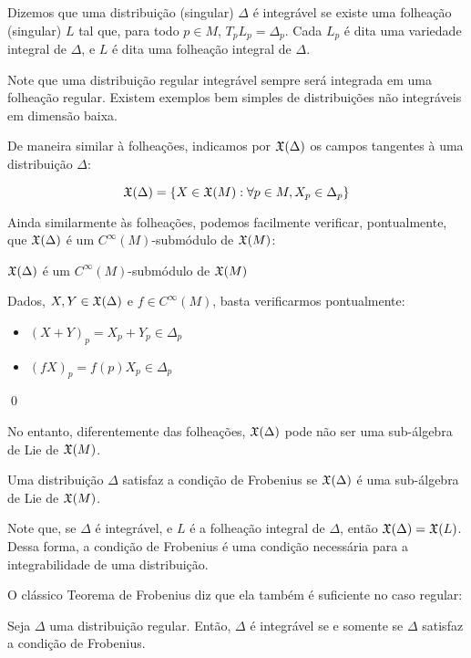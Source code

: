 Dizemos que uma distribuição (singular) $\Delta$ é integrável
se existe uma folheação (singular) $L$ tal que, para todo
$p \in M$, $T_p L_p = \Delta_p$. Cada $L_p$ é dita uma variedade integral
de $\Delta$, e $L$ é dita uma folheação integral de $\Delta$.

Note que uma distribuição regular integrável sempre será integrada em uma
folheação regular. Existem exemplos bem simples de distribuições não integráveis
em dimensão baixa.

De maneira similar à folheações, indicamos por $\mathfrak{X}(\Delta)$ os campos tangentes à
uma distribuição $\Delta$:

$$\mathfrak{X}(\Delta) = \{X \in \mathfrak{X}(M) : \forall p \in M, X_p \in \Delta_p\}$$

Ainda similarmente às folheações,
podemos facilmente verificar, pontualmente, que $\mathfrak{X}(\Delta)$
é um $C^\infty(M)$-submódulo
de $\mathfrak{X}(M)$:

\begin{proposition}
    $\mathfrak{X}(\Delta)$ é um $C^\infty(M)$-submódulo
    de $\mathfrak{X}(M)$
\end{proposition}

\dem Dados, $X,Y \in \mathfrak{X}(\Delta)$ e $f \in C^\infty(M)$, basta verificarmos pontualmente:

\begin{itemize}
    \item $(X+Y)_p = X_p + Y_p \in \Delta_p$
    \item $(fX)_p = f(p) X_p \in \Delta_p$
\end{itemize} \qed

No entanto, diferentemente das folheações, $\mathfrak{X}(\Delta)$ pode não ser
uma sub-álgebra de Lie de $\mathfrak{X}(M)$.

\begin{definition}
    Uma distribuição $\Delta$ satisfaz a condição de Frobenius
    se $\mathfrak{X}(\Delta)$ é uma sub-álgebra de Lie de $\mathfrak{X}(M)$.
\end{definition}

Note que, se $\Delta$ é integrável, e $L$ é a folheação integral de $\Delta$,
então $\mathfrak{X}(\Delta) = \mathfrak{X}(L)$. Dessa forma, a condição de Frobenius é uma condição
necessária para a integrabilidade de uma distribuição.

O clássico Teorema de Frobenius diz que ela também é suficiente no caso regular:

\begin{theorem}
    Seja $\Delta$ uma distribuição regular. Então, $\Delta$ é integrável
    se e somente se $\Delta$ satisfaz a condição de Frobenius.
\end{theorem}

